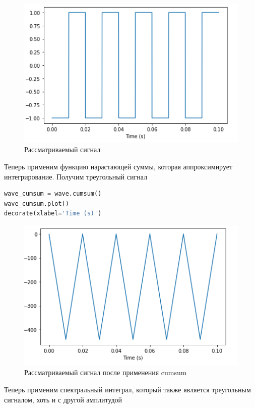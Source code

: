 \begin{figure}[H]
	\begin{center}
		\includegraphics[scale=1]{fig/lab09/lab09_04.png}
		\caption{Рассматриваемый сигнал}
	\end{center}
\end{figure}

Теперь применим функцию нарастающей суммы, которая аппроксимирует интегрирование. Получим треугольный сигнал

\begin{lstlisting}[language=Python]
wave_cumsum = wave.cumsum()
wave_cumsum.plot()
decorate(xlabel='Time (s)')
\end{lstlisting}

\begin{figure}[H]
	\begin{center}
		\includegraphics[scale=1]{fig/lab09/lab09_05.png}
		\caption{Рассматриваемый сигнал после применения cumsum}
	\end{center}
\end{figure}

Теперь применим спектральный интеграл, который также является треугольным сигналом, хоть и с другой амплитудой

